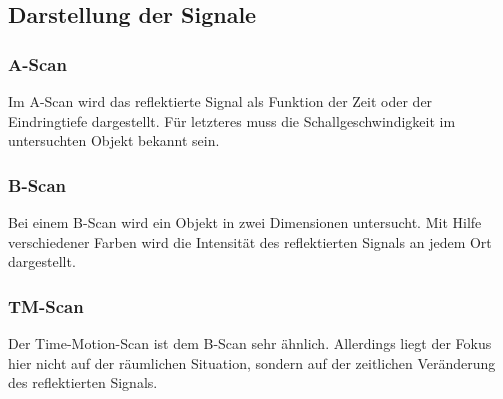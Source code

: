 \subsection{Darstellung der Signale}
\subsubsection*{A-Scan}
Im A-Scan wird das reflektierte Signal als Funktion der Zeit oder der Eindringtiefe dargestellt. Für letzteres muss die Schallgeschwindigkeit im untersuchten Objekt bekannt sein.
\subsubsection*{B-Scan}
Bei einem B-Scan wird ein Objekt in zwei Dimensionen untersucht. Mit Hilfe verschiedener Farben wird die Intensität des reflektierten Signals an jedem Ort dargestellt.
\subsubsection*{TM-Scan}
Der Time-Motion-Scan ist dem B-Scan sehr ähnlich. Allerdings liegt der Fokus hier nicht auf der räumlichen Situation, sondern auf der zeitlichen Veränderung des reflektierten Signals.
